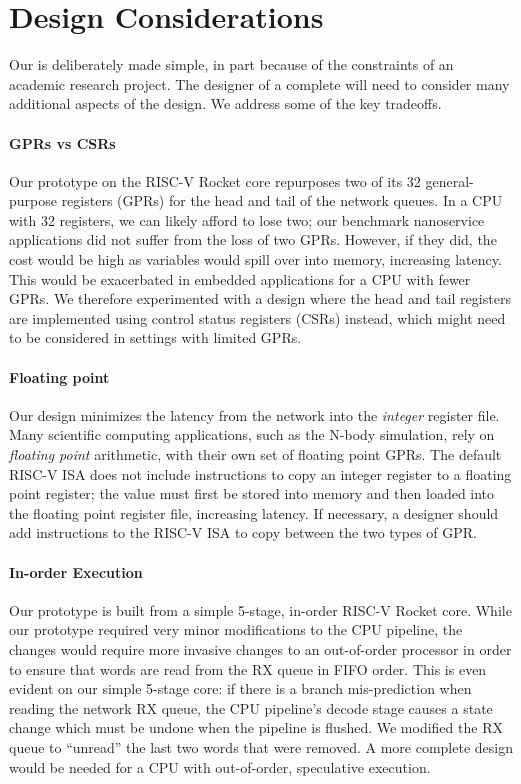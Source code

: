 \section{Design Considerations}
Our \name{} is deliberately made simple, in part because of the constraints of an academic research project. The designer of a complete \name{} will need to consider many additional aspects of the design. We address some of the key tradeoffs. 

\paragraph{GPRs vs CSRs} Our \name{} prototype on the RISC-V Rocket core repurposes two of its 32 general-purpose registers (GPRs) for the head and tail of the network queues. In a CPU with 32 registers, we can likely afford to lose two; our benchmark nanoservice applications did not suffer from the loss of two GPRs. However, if they did, the cost would be high as variables would spill over into memory, increasing latency. This would be exacerbated in embedded applications for a CPU with fewer GPRs. We therefore experimented with a design where the head and tail registers are implemented using control status registers (CSRs) instead, which might need to be considered in  settings with limited GPRs.

\paragraph{Floating point} Our \name{} design minimizes the latency from the network into the \emph{integer} register file.
Many scientific computing applications, such as the N-body simulation, rely on \emph{floating point} arithmetic, with their own set of floating point GPRs.
The default RISC-V ISA does not include instructions to copy an integer register to a floating point register; the value must first be stored into memory and then loaded into the floating point register file, increasing latency. If necessary, a designer should add instructions to the RISC-V ISA to copy between the two types of GPR. 

\paragraph{In-order Execution} Our \name{} prototype is built from a simple 5-stage, in-order RISC-V Rocket core.  While our prototype required very minor modifications to the CPU pipeline, the changes would require more invasive changes to an out-of-order processor in order to ensure that words are read from the RX queue in FIFO order. This is even evident on our simple 5-stage core: if there is a branch mis-prediction when reading the network RX queue, the CPU pipeline's decode stage causes a state change which must be undone when the pipeline is flushed. We modified the RX queue to ``unread'' the last two words that were removed. A more complete design would be needed for a CPU with out-of-order, speculative execution.


